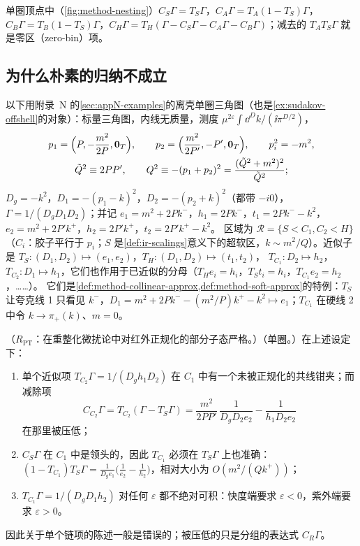单圈顶点中（\cref{fig:method-nesting}）$C_S\Gamma=T_S\Gamma$，$C_A\Gamma=T_A(1-T_S)\Gamma$，$C_B\Gamma=T_B(1-T_S)\Gamma$，$C_H\Gamma=T_H(\Gamma-C_S\Gamma-C_A\Gamma-C_B\Gamma)$；减去的 $T_AT_S\Gamma$ 就是零区（zero-bin）项。

\subsection{为什么朴素的归纳不成立}

以下用附录~N 的\cref{sec:appN-examples}的离壳单圈三角图（也是\cref{ex:sudakov-offshell}的对象）：标量三角图，内线无质量，测度 $\mu^{2\varepsilon}\int\dd^Dk/(\ii\pi^{D/2})$，
\begin{equation}\label{eq:method-tri-kin}
\begin{gathered}
p_1=\Bigl(P,-\frac{m^2}{2P},\mathbf 0_T\Bigr),\qquad p_2=\Bigl(\frac{m^2}{2P'},-P',\mathbf 0_T\Bigr),\qquad p_i^2=-m^2,\\
\tilde Q^2\equiv2PP',\qquad Q^2\equiv-(p_1+p_2)^2=\frac{(\tilde Q^2+m^2)^2}{\tilde Q^2} ;
\end{gathered}
\end{equation}
$D_g=-k^2$，$D_1=-(p_1-k)^2$，$D_2=-(p_2+k)^2$（都带 $-i0$），$\Gamma=1/(D_gD_1D_2)$；并记 $e_1=m^2+2Pk^-$，$h_1=2Pk^-$，$t_1=2Pk^--k^2$，$e_2=m^2+2P'k^+$，$h_2=2P'k^+$，$t_2=2P'k^+-k^2$。
区域为 $\mathcal R=\{S<C_1,C_2<H\}$（$C_i$：胶子平行于 $p_i$；$S$ 是\cref{def:ir-scalings}意义下的超软区，$k\sim m^2/Q$）。近似子是 $T_S:(D_1,D_2)\mapsto(e_1,e_2)$，$T_H:(D_1,D_2)\mapsto(t_1,t_2)$，
$T_{C_1}:D_2\mapsto h_2$，$T_{C_2}:D_1\mapsto h_1$，它们也作用于已近似的分母（$T_He_i=h_i$，$T_St_i=h_i$，$T_{C_1}e_2=h_2$，……）。
它们是\cref{def:method-collinear-approx,def:method-soft-approx}的特例：$T_S$ 让夸克线 1 只看见 $k^-$，$D_1=m^2+2Pk^--(m^2/P)k^+-k^2\mapsto e_1$；$T_{C_1}$ 在硬线 2 中令 $k\to\pi_+(k)$、$m=0$。

\begin{example}\label{ex:method-naive-induction}
（$R_{\mathrm{PT}}$：在重整化微扰论中对红外正规化的部分子态严格。）（单圈。）在上述设定下：
\begin{enumerate}[label=(\alph*),leftmargin=2em,itemsep=1pt,topsep=2pt]
\item 单个近似项 $T_{C_2}\Gamma=1/(D_gh_1D_2)$ 在 $C_1$ 中有一个未被正规化的共线钳夹；而减除项
  \begin{equation}\label{eq:method-CC2}
  C_{C_2}\Gamma=T_{C_2}(\Gamma-T_S\Gamma)=\frac{m^2}{2PP'}\,\frac1{D_gD_2e_2}-\frac1{h_1D_2e_2}
  \end{equation}
  在那里被压低；
\item $C_S\Gamma$ 在 $C_1$ 中是领头的，因此 $T_{C_1}$ 必须在 $T_S\Gamma$ 上也准确：$(1-T_{C_1})T_S\Gamma=\frac1{D_ge_1}\bigl(\frac1{e_2}-\frac1{h_2}\bigr)$，相对大小为 $O(m^2/(Qk^+))$；
\item $T_{C_1}\Gamma=1/(D_gD_1h_2)$ 对任何 $\varepsilon$ 都不绝对可积：快度端要求 $\varepsilon<0$，紫外端要求 $\varepsilon>0$。
\end{enumerate}
因此关于单个链项的陈述一般是错误的；被压低的只是分组的表达式 $C_R\Gamma$。
\end{example}

